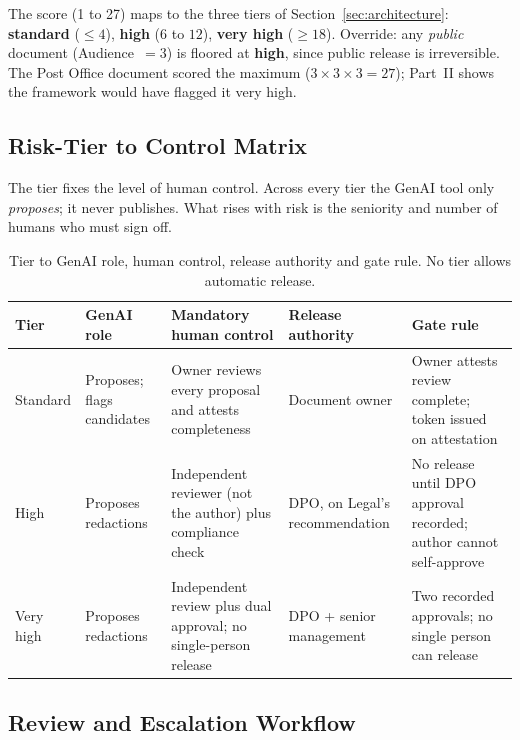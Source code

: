 \documentclass[12pt,a4paper]{article}
\begin{document}
The score (1 to 27) maps to the three tiers of Section~\ref{sec:architecture}: \textbf{standard} ($\leq 4$), \textbf{high} ($6$ to $12$), \textbf{very high} ($\geq 18$). Override: any \emph{public} document (Audience~$=3$) is floored at \textbf{high}, since public release is irreversible. The Post Office document scored the maximum ($3\times3\times3=27$); Part~II shows the framework would have flagged it very high.

\subsection{Risk-Tier to Control Matrix}

The tier fixes the level of human control. Across every tier the GenAI tool only \emph{proposes}; it never publishes. What rises with risk is the seniority and number of humans who must sign off.

\begin{table}[H]
\centering
\footnotesize
{}
\begin{tabular}{@{} p{1.3cm} p{2.4cm} p{3.2cm} p{2.5cm} p{3.3cm} @{}}
\toprule
\textbf{\color{accentdark}Tier} & \textbf{\color{accentdark}GenAI role} & \textbf{\color{accentdark}Mandatory human control} & \textbf{\color{accentdark}Release authority} & \textbf{\color{accentdark}Gate rule} \\
\midrule
Standard & Proposes; flags candidates & Owner reviews every proposal and attests completeness & Document owner & Owner attests review complete; token issued on attestation \\
High & Proposes redactions & Independent reviewer (not the author) plus compliance check & DPO, on Legal's recommendation & No release until DPO approval recorded; author cannot self-approve \\
Very high & Proposes redactions & Independent review plus dual approval; no single-person release & DPO + senior management & Two recorded approvals; no single person can release \\
\bottomrule
\end{tabular}
\caption{Tier to GenAI role, human control, release authority and gate rule. No tier allows automatic release.}
\label{tab:risktier}
\end{table}

\subsection{Review and Escalation Workflow}
\end{document}
